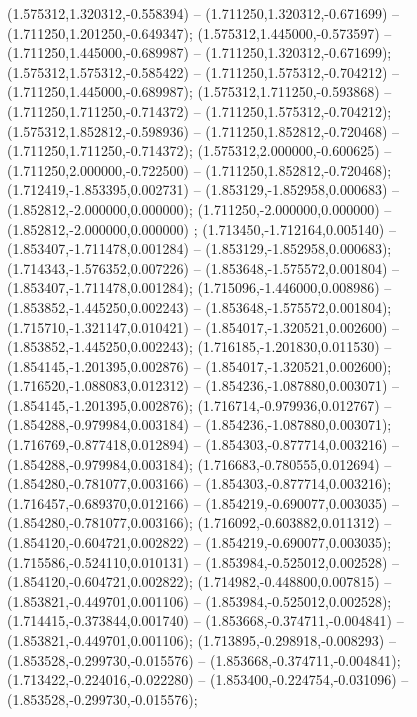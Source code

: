  (1.575312,1.320312,-0.558394) -- (1.711250,1.320312,-0.671699) -- (1.711250,1.201250,-0.649347);
 (1.575312,1.445000,-0.573597) -- (1.711250,1.445000,-0.689987) -- (1.711250,1.320312,-0.671699);
 (1.575312,1.575312,-0.585422) -- (1.711250,1.575312,-0.704212) -- (1.711250,1.445000,-0.689987);
 (1.575312,1.711250,-0.593868) -- (1.711250,1.711250,-0.714372) -- (1.711250,1.575312,-0.704212);
 (1.575312,1.852812,-0.598936) -- (1.711250,1.852812,-0.720468) -- (1.711250,1.711250,-0.714372);
 (1.575312,2.000000,-0.600625) -- (1.711250,2.000000,-0.722500) -- (1.711250,1.852812,-0.720468);
 (1.712419,-1.853395,0.002731) -- (1.853129,-1.852958,0.000683) -- (1.852812,-2.000000,0.000000);
 (1.711250,-2.000000,0.000000) -- (1.852812,-2.000000,0.000000) ;
 (1.713450,-1.712164,0.005140) -- (1.853407,-1.711478,0.001284) -- (1.853129,-1.852958,0.000683);
 (1.714343,-1.576352,0.007226) -- (1.853648,-1.575572,0.001804) -- (1.853407,-1.711478,0.001284);
 (1.715096,-1.446000,0.008986) -- (1.853852,-1.445250,0.002243) -- (1.853648,-1.575572,0.001804);
 (1.715710,-1.321147,0.010421) -- (1.854017,-1.320521,0.002600) -- (1.853852,-1.445250,0.002243);
 (1.716185,-1.201830,0.011530) -- (1.854145,-1.201395,0.002876) -- (1.854017,-1.320521,0.002600);
 (1.716520,-1.088083,0.012312) -- (1.854236,-1.087880,0.003071) -- (1.854145,-1.201395,0.002876);
 (1.716714,-0.979936,0.012767) -- (1.854288,-0.979984,0.003184) -- (1.854236,-1.087880,0.003071);
 (1.716769,-0.877418,0.012894) -- (1.854303,-0.877714,0.003216) -- (1.854288,-0.979984,0.003184);
 (1.716683,-0.780555,0.012694) -- (1.854280,-0.781077,0.003166) -- (1.854303,-0.877714,0.003216);
 (1.716457,-0.689370,0.012166) -- (1.854219,-0.690077,0.003035) -- (1.854280,-0.781077,0.003166);
 (1.716092,-0.603882,0.011312) -- (1.854120,-0.604721,0.002822) -- (1.854219,-0.690077,0.003035);
 (1.715586,-0.524110,0.010131) -- (1.853984,-0.525012,0.002528) -- (1.854120,-0.604721,0.002822);
 (1.714982,-0.448800,0.007815) -- (1.853821,-0.449701,0.001106) -- (1.853984,-0.525012,0.002528);
 (1.714415,-0.373844,0.001740) -- (1.853668,-0.374711,-0.004841) -- (1.853821,-0.449701,0.001106);
 (1.713895,-0.298918,-0.008293) -- (1.853528,-0.299730,-0.015576) -- (1.853668,-0.374711,-0.004841);
 (1.713422,-0.224016,-0.022280) -- (1.853400,-0.224754,-0.031096) -- (1.853528,-0.299730,-0.015576);
